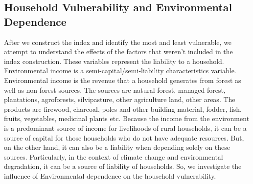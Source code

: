 \subsection{Household Vulnerability and Environmental Dependence}
After we construct the index and identify the most and least vulnerable, we attempt to understand the effects of the factors that weren't included in the index construction. These variables represent the liability to a household. Environmental income is a semi-capital/semi-liability characteristics variable. Environmental income is the revenue that a household generates from forest as well as non-forest sources. The sources are natural forest, managed forest, plantations, agroforests, silvipasture, other agriculture land, other areas. The products are firewood, charcoal, poles and other building material, fodder, fish, fruits, vegetables, medicinal plants etc. Because the income from the environment is a predominant source of income for livelihoods of rural households, it can be a source of capital for those households who do not have adequate resources. But, on the other hand, it can also be a liability when depending solely on these sources. Particularly, in the context of climate change and environmental degradation, it can be a source of liability of households. So, we investigate the influence of Environmental dependence on the household vulnerability.\par

